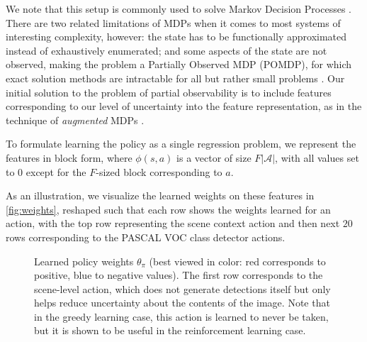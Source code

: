 We note that this setup is commonly used to solve Markov Decision Processes \cite{Sutton1998}.
There are two related limitations of MDPs when it comes to most systems of interesting complexity, however: the state has to be functionally approximated instead of exhaustively enumerated; and some aspects of the state are not observed, making the problem a Partially Observed MDP (POMDP), for which exact solution methods are intractable for all but rather small problems \cite{Roy2002}.
Our initial solution to the problem of partial observability is to include features corresponding to our level of uncertainty into the feature representation, as in the technique of \emph{augmented} MDPs \cite{Kwok2004}.

To formulate learning the policy as a single regression problem, we represent the features in block form, where $\phi(s,a)$ is a vector of size $F|\mathcal{A}|$, with all values set to $0$ except for the $F$-sized block corresponding to $a$.

As an illustration, we visualize the learned weights on these features in \autoref{fig:weights}, reshaped such that each row shows the weights learned for an action, with the top row representing the scene context action and then next $20$ rows corresponding to the PASCAL VOC class detector actions.

\begin{figure}[h!]
\centering
{}
\caption{
Learned policy weights $\theta_\pi$ (best viewed in color: red corresponds to positive, blue to negative values).
The first row corresponds to the scene-level action, which does not generate detections itself but only helps reduce uncertainty about the contents of the image.
Note that in the greedy learning case, this action is learned to never be taken, but it is shown to be useful in the reinforcement learning case.
}
\label{fig:weights}
\end{figure}

